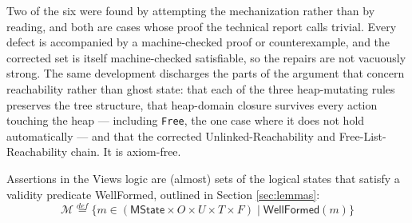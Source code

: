 Two of the six were found by attempting the mechanization rather than by reading, and both are cases whose proof the technical report calls trivial.  Every defect is accompanied by a machine-checked proof or counterexample, and the corrected set is itself machine-checked satisfiable, so the repairs are not vacuously strong.  The same development discharges the parts of the argument that concern reachability rather than ghost state: that each of the three heap-mutating rules preserves the tree structure, that heap-domain closure survives every action touching the heap --- including \texttt{Free}, the one case where it does not hold automatically --- and that the corrected \textsf{Unlinked-Reachability} and \textsf{Free-List-Reachability} chain.  It is axiom-free.

Assertions in the Views logic are (almost) sets of the logical states that satisfy a validity predicate \textsf{WellFormed}, outlined in Section \ref{sec:lemmas}:
\[\mathcal{M} \stackrel{def}{=} \{ m \in (\textsf{MState} \times O \times U \times T \times F) \mid  \textsf{WellFormed}(m) \} \]

